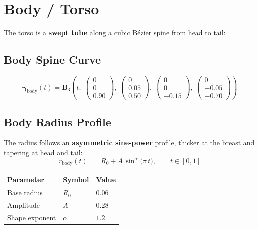 \documentclass[12pt,a4paper]{article}
\newcommand{\vv}[1]{\bm{#1}}          %
\begin{document}
\section{Body / Torso}

The torso is a \textbf{swept tube} along a cubic Bézier spine from head to
tail:

\subsection{Body Spine Curve}
\begin{equation}
  \vv{\gamma}_{\mathrm{body}}(t)
  = \vv{B}_3\!\left(t;\;
    \begin{pmatrix}0\\0\\0.90\end{pmatrix},\;
    \begin{pmatrix}0\\0.05\\0.50\end{pmatrix},\;
    \begin{pmatrix}0\\0\\-0.15\end{pmatrix},\;
    \begin{pmatrix}0\\-0.05\\-0.70\end{pmatrix}
  \right)
\end{equation}

\subsection{Body Radius Profile}

The radius follows an \textbf{asymmetric sine-power} profile, thicker at
the breast and tapering at head and tail:
\begin{equation}
  r_{\mathrm{body}}(t)
  \;=\;
  R_0
  + A\,\sin^{\alpha}\!\bigl(\pi\,t\bigr),
  \qquad t\in[0,1]
\end{equation}

\begin{center}
\begin{tabular}{lll}
  \toprule
  Parameter & Symbol & Value \\
  \midrule
  Base radius      & $R_0$    & $0.06$ \\
  Amplitude        & $A$      & $0.28$ \\
  Shape exponent   & $\alpha$ & $1.2$  \\
  \bottomrule
\end{tabular}
\end{center}
\end{document}
